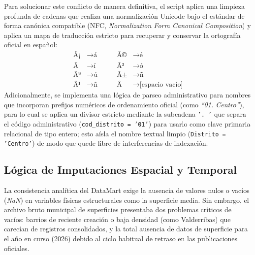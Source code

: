 \documentclass[a4paper,11pt,openany]{book}
\begin{document}
Para solucionar este conflicto de manera definitiva, el script aplica una limpieza profunda de cadenas que realiza una normalización Unicode bajo el estándar de forma canónica compatible (NFC, \textit{Normalization Form Canonical Composition}) y aplica un mapa de traducción estricto para recuperar y conservar la ortografía oficial en español:
\begin{align*}
    \text{Ã¡} &\rightarrow \text{á} \qquad & \text{Ã©} &\rightarrow \text{é} \\
    \text{Ã­} &\rightarrow \text{í} \qquad & \text{Ã³} &\rightarrow \text{ó} \\
    \text{Ãº} &\rightarrow \text{ú} \qquad & \text{Ã±} &\rightarrow \text{ñ} \\
    \text{Ã¹} &\rightarrow \text{ñ} \qquad & \text{Â} &\rightarrow \text{[espacio vacío]}
\end{align*}
Adicionalmente, se implementa una lógica de parseo administrativo para nombres que incorporan prefijos numéricos de ordenamiento oficial (como \textit{``01. Centro''}), para lo cual se aplica un divisor estricto mediante la subcadena \texttt{'. '} que separa el código administrativo (\texttt{cod\_distrito = '01'}) para usarlo como clave primaria relacional de tipo entero; esto aísla el nombre textual limpio (\texttt{Distrito = 'Centro'}) de modo que quede libre de interferencias de indexación.

\subsection{Lógica de Imputaciones Espacial y Temporal}
La consistencia analítica del DataMart exige la ausencia de valores nulos o vacíos (\textit{NaN}) en variables físicas estructurales como la superficie media. Sin embargo, el archivo bruto municipal de superficies presentaba dos problemas críticos de vacíos: barrios de reciente creación o baja densidad (como Valderribas) que carecían de registros consolidados, y la total ausencia de datos de superficie para el año en curso (2026) debido al ciclo habitual de retraso en las publicaciones oficiales. 
\end{document}
